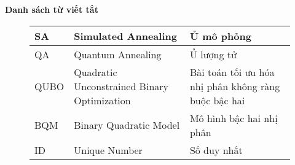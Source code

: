 

\thispagestyle{empty}
\listoffigures
\newpage
\thispagestyle{empty}


\listoftables
\newpage

\thispagestyle{empty}


\newpage
\thispagestyle{empty}
{\huge{\textbf{Danh sách từ viết tắt}}}

\begin{figure}[H]
	\centering
	\begin{adjustwidth}{-1cm}{}
		\begin{center}
	\begin{tabular}{|l|l|l|}
		\hline
		SA & Simulated Annealing & Ủ mô phỏng \\
		\hline
		QA & Quantum Annealing & Ủ lượng tử \\
		\hline
		QUBO & Quadratic Unconstrained Binary Optimization & Bài toán tối ưu hóa nhị phân không ràng buộc bậc hai \\
		\hline
		BQM & Binary Quadratic Model & Mô hình bậc hai nhị phân \\
		\hline
		ID & Unique Number & Số duy nhất \\
		\hline
	\end{tabular}
\end{center}
\end{adjustwidth}
\end{figure}

\clearpage
